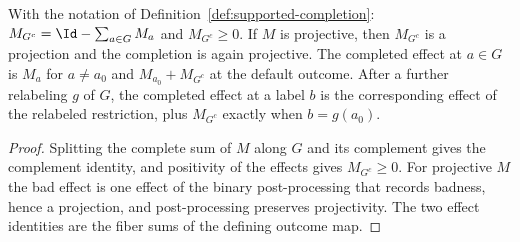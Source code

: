 	\begin{lemma}
		\label{lem:supported-completion-structure}
		\leanok
		With the notation of Definition~\ref{def:supported-completion}:
		$M_{G^c} = \Id - \sum_{a \in G} M_a$ and $M_{G^c} \geq 0$. If $M$ is
		projective, then $M_{G^c}$ is a projection and the completion is again
		projective. The completed effect at $a \in G$ is $M_a$ for $a \neq a_0$
		and $M_{a_0} + M_{G^c}$ at the default outcome. After a further
		relabeling $g$ of $G$, the completed effect at a label $b$ is the
		corresponding effect of the relabeled restriction, plus $M_{G^c}$
		exactly when $b = g(a_0)$.
	\end{lemma}
	\begin{proof}
		\leanok
		Splitting the complete sum of $M$ along $G$ and its complement gives the
		complement identity, and positivity of the effects gives
		$M_{G^c} \geq 0$. For projective $M$ the bad effect is one effect of the
		binary post-processing that records badness, hence a projection, and
		post-processing preserves projectivity. The two effect identities are the
		fiber sums of the defining outcome map.
	\end{proof}

